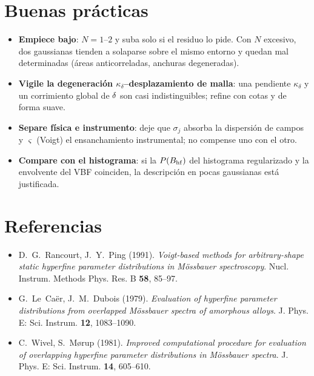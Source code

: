 \section{Buenas prácticas}
\label{sec:vbf-practica}

\begin{itemize}[nosep]
  \item \textbf{Empiece bajo}: $N=1$--$2$ y suba solo si el residuo lo pide. Con
        $N$ excesivo, dos gaussianas tienden a solaparse sobre el mismo entorno y
        quedan mal determinadas (áreas anticorreladas, anchuras degeneradas).
  \item \textbf{Vigile la degeneración $\kappa_\delta$--desplazamiento de malla}:
        una pendiente $\kappa_\delta$ y un corrimiento global de $\delta$ son casi
        indistinguibles; refine con cotas y de forma suave.
  \item \textbf{Separe física e instrumento}: deje que $\sigma_j$ absorba la
        dispersión de campos y $\varsigma$ (Voigt) el ensanchamiento
        instrumental; no compense uno con el otro.
  \item \textbf{Compare con el histograma}: si la $P(B_{\mathrm{hf}})$ del histograma
        regularizado y la envolvente del VBF coinciden, la descripción en pocas
        gaussianas está justificada.
\end{itemize}

\section*{Referencias}
\begin{itemize}[nosep]
  \item D.~G.~Rancourt, J.~Y.~Ping (1991). \emph{Voigt-based methods for
        arbitrary-shape static hyperfine parameter distributions in Mössbauer
        spectroscopy}. Nucl. Instrum. Methods Phys. Res. B \textbf{58}, 85--97.
  \item G.~Le~Caër, J.~M.~Dubois (1979). \emph{Evaluation of hyperfine parameter
        distributions from overlapped Mössbauer spectra of amorphous alloys}.
        J. Phys. E: Sci. Instrum. \textbf{12}, 1083--1090.
  \item C.~Wivel, S.~M\o{}rup (1981). \emph{Improved computational procedure for
        evaluation of overlapping hyperfine parameter distributions in Mössbauer
        spectra}. J. Phys. E: Sci. Instrum. \textbf{14}, 605--610.
\end{itemize}
